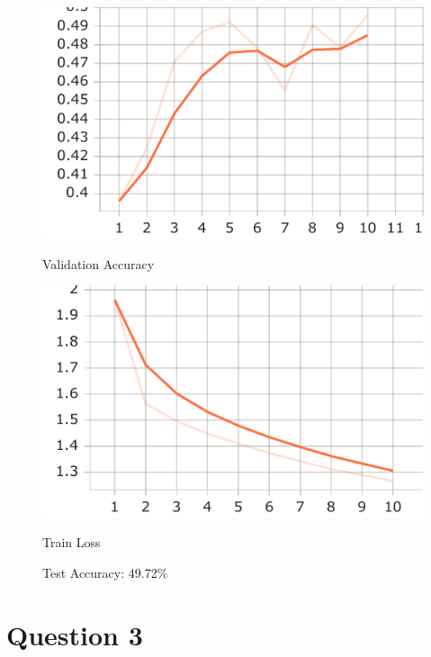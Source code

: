 \documentclass{article}
\begin{document}
\begin{figure}[H]
    \centering
    \begin{minipage}{0.45\textwidth}
        \centering
        \includegraphics[width=\linewidth]{images/numpy/Accuracy_val.pdf}
        \caption{Validation Accuracy}
    \end{minipage} \hfill
    \begin{minipage}{0.45\textwidth}
        \centering
        \includegraphics[width=\linewidth]{images/numpy/Loss_train.pdf}
        \caption{Train Loss}
    \end{minipage}
    \caption{Test Accuracy: 49.72\%}
\end{figure}



\section*{Question 3}
\end{document}
